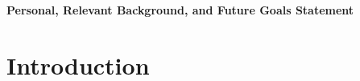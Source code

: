 \documentclass[11pt]{article}
\begin{document}
	
	
	
\begin{center}
	\textbf{\large Personal, Relevant Background, and Future Goals Statement}
\end{center}
	
	
	
\section*{Introduction}
%	
%	

%	
	
%	
%	
	
\end{document}
